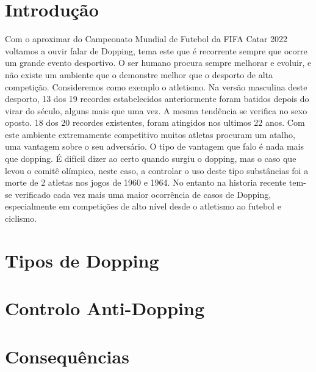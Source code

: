 \documentclass{report}
\begin{document}


\tableofcontents


\clearpage
{}

\chapter{Introdução}

\label{chap.introducao}
    Com o aproximar do Campeonato Mundial de Futebol da FIFA Catar 2022 voltamos a ouvir falar de Dopping, tema este que é recorrente sempre que ocorre um grande evento desportivo.
    O ser humano procura sempre melhorar e evoluir, e não existe um ambiente que o demonstre melhor que o desporto de alta competição. Consideremos como exemplo o atletismo. Na versão masculina deste  desporto,  13 dos 19 recordes estabelecidos anteriormente foram batidos depois do virar do século, alguns mais que uma vez. A mesma tendência se verifica no sexo oposto. 18 dos 20 recordes existentes, foram atingidos nos ultimos 22 anos. Com este ambiente extremamente competitivo muitos atletas procuram um atalho, uma vantagem sobre o seu adversário. O tipo de vantagem que falo é nada mais que dopping.
    É difícil dizer ao certo quando surgiu o dopping, mas o caso que levou o comitê olímpico, neste caso, a controlar o uso deste tipo substâncias foi a morte de 2 atletas nos jogos de 1960 e 1964.
    No entanto na historia recente tem-se verificado cada vez mais uma maior ocorrência de casos de Dopping, especialmente em competições de alto nível desde o atletismo ao futebol e ciclismo.

\chapter {Tipos de Dopping}
\chapter {Controlo Anti-Dopping}
\chapter {Consequências}
\end{document}
